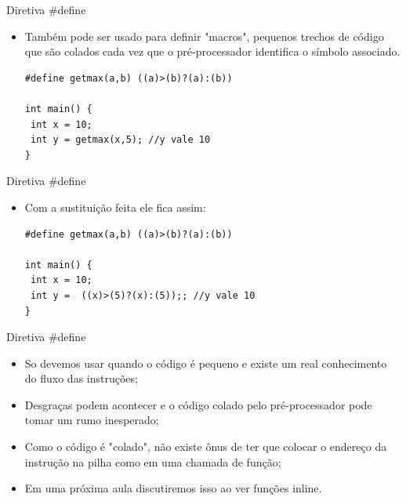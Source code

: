 \documentclass[12pt,table,xcolor={dvipsnames}]{beamer}
\begin{document}
\begin{frame}[fragile]{Diretiva \#define}
\begin{itemize}
\item Também pode ser usado para definir "macros", pequenos trechos de código que são colados cada vez que o pré-processador identifica o símbolo associado.
\begin{lstlisting}
#define getmax(a,b) ((a)>(b)?(a):(b))

int main() {
 int x = 10;
 int y = getmax(x,5); //y vale 10
}
\end{lstlisting}
\end{itemize}
\end{frame}

\begin{frame}[fragile]{Diretiva \#define}
\begin{itemize}
\item Com a sustituição feita ele fica assim:
\begin{lstlisting}
#define getmax(a,b) ((a)>(b)?(a):(b))

int main() {
 int x = 10;
 int y =  ((x)>(5)?(x):(5));; //y vale 10
}
\end{lstlisting}
\end{itemize}
\end{frame}

\begin{frame}[fragile]{Diretiva \#define}
\begin{itemize}
\item So devemos usar quando o código é pequeno e existe um real conhecimento do fluxo das instruções;
\item Desgraças podem acontecer e o código colado pelo pré-processador pode tomar um rumo inesperado;
\item Como o código é "colado", não existe ônus de ter que colocar o endereço da instrução na pilha como em uma chamada de função; 
\item Em uma próxima aula discutiremos isso ao ver funções inline.
\end{itemize}
\end{frame}
\end{document}
